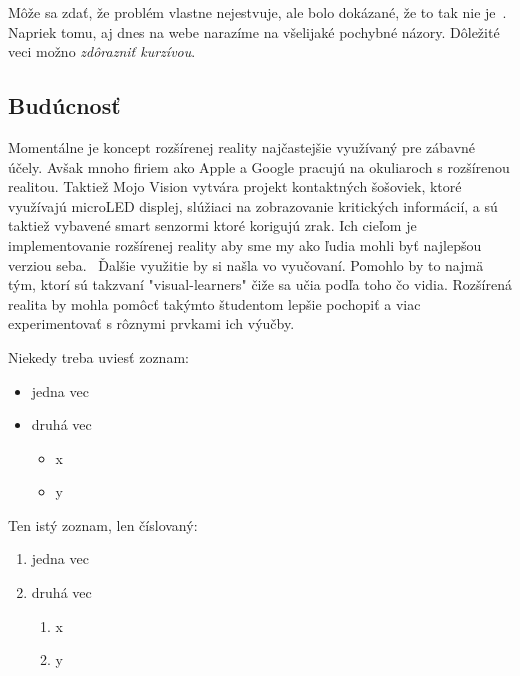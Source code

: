 \documentclass[10pt,twoside,a4paper]{article}
\begin{document}
Môže sa zdať, že problém vlastne nejestvuje\cite{}, ale bolo dokázané, že to tak nie je~\cite{}. Napriek tomu, aj dnes na webe narazíme na všelijaké pochybné názory\cite{}. Dôležité veci možno \emph{zdôrazniť kurzívou}.


\subsection{Budúcnosť} \label{vyuzitie:bud}

Momentálne je koncept rozšírenej reality najčastejšie využívaný pre zábavné účely. Avšak mnoho firiem ako Apple a Google pracujú na okuliaroch s rozšírenou realitou. Taktiež Mojo Vision vytvára projekt kontaktných šošoviek, ktoré využívajú microLED displej, slúžiaci na zobrazovanie kritických informácií, a sú taktiež vybavené smart senzormi ktoré korigujú zrak. Ich cieľom je implementovanie rozšírenej reality aby sme my ako ľudia mohli byť najlepšou verziou seba.~\cite{Mojo} Ďalšie využitie by si našla vo vyučovaní. Pomohlo by to najmä tým, ktorí sú takzvaní "visual-learners" čiže sa učia podľa toho čo vidia. Rozšírená realita by mohla pomôcť takýmto študentom lepšie pochopiť a viac experimentovať s rôznymi prvkami ich výučby.


Niekedy treba uviesť zoznam:

\begin{itemize}
\item jedna vec
\item druhá vec
	\begin{itemize}
	\item x
	\item y
	\end{itemize}
\end{itemize}

Ten istý zoznam, len číslovaný:

\begin{enumerate}
\item jedna vec
\item druhá vec
	\begin{enumerate}
	\item x
	\item y
	\end{enumerate}
\end{enumerate}
\end{document}
